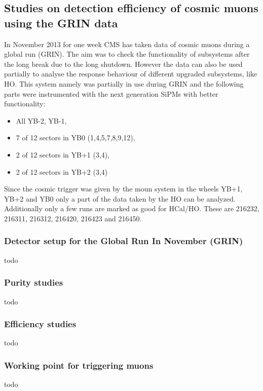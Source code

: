 	\subsection{Studies on detection efficiency of cosmic muons using the GRIN data} 
		In November 2013 for one week CMS has taken data of cosmic muons during a global run (GRIN).
		The aim was to check the functionality of subsystems after the long break due to the long shutdown.
		However the data can also be used partially to analyse the response behaviour of different upgraded subsystems, like HO. 
		This system namely was partially in use during GRIN and the following parts were instrumented with the next generation SiPMs with better functionality:
		\begin{itemize}
			\item All YB-2, YB-1,
			\item 7 of 12 sectors in YB0 (1,4,5,7,8,9,12),
			\item 2 of 12 sectors in YB+1 (3,4),
			\item 2 of 12 sectors in YB+2 (3,4)
		\end{itemize}
		Since the cosmic trigger was given by the moun system in the wheels YB+1, YB+2 and YB0 only a part of the data taken by the HO can be analyzed.
		Additionally only a few runs are marked as good for HCal/HO.
		These are 216232, 216311, 216312, 216420, 216423 and 216450.
		
		\subsubsection{Detector setup for the Global Run In November (GRIN)}
			todo
		\subsubsection{Purity studies}
			todo
		\subsubsection{Efficiency studies}
			todo
		\subsubsection{Working point for triggering muons}
			todo
